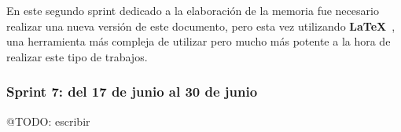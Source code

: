 En este segundo sprint dedicado a la elaboración de la memoria fue necesario realizar una nueva versión de este
documento, pero esta vez utilizando \textbf{LaTeX}~\cite{url_latex}, una herramienta más compleja
de utilizar pero mucho más potente a la hora de realizar este tipo de trabajos.

\subsubsection{Sprint 7: del 17 de junio al 30 de junio}

\colorbox{color_highlight}{@TODO: escribir}